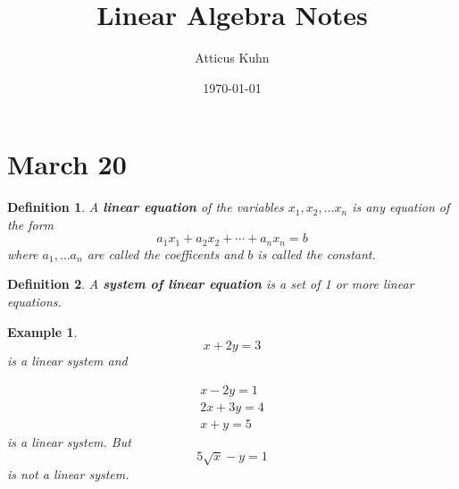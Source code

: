 \documentclass[11pt]{article}
\title{Linear Algebra Notes}
\author{Atticus Kuhn}
\date{\today}
\newtheorem{defn}{Definition}
\newtheorem{ex}{Example}
\begin{document}
\maketitle
\tableofcontents
\section{March 20}
\begin{defn}
  A \textbf{linear equation} of the variables $x_{1}, x_{2}, \ldots x_{n}$ is any equation of the form
  \[a_{1}x_{1}+a_{2}x_{2} + \cdots + a_{n}x_{n} = b\]
  where $a_{1}, \ldots a_{n}$ are called the coefficents and $b$ is called the constant.
  \end{defn}
  \begin{defn}
    A \textbf{system of linear equation} is a set of 1 or more linear equations.
    \end{defn}
    \begin{ex}
      \[x + 2y = 3\]
      is a linear system and

      \begin{align*}
        x-2y = 1 \\
        2x + 3y = 4 \\
        x + y =  5
        \end{align*}
        is a linear system.
        But
        \[5 \sqrt{x} - y=1\]
        is not a linear system.
      \end{ex}
\end{document}
